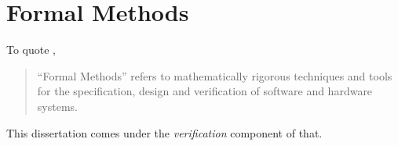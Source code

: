 \section{Formal Methods}\label{se:formal_methods}
To quote \textcite{butler:fm},
\begin{quote}
  ``Formal Methods''
  refers to mathematically rigorous techniques and tools
  for the specification, design and verification of software and hardware systems.
\end{quote}
This dissertation comes under the \emph{verification} component of that.%
%
%
%
%
%
%
%
%
%
%
%

